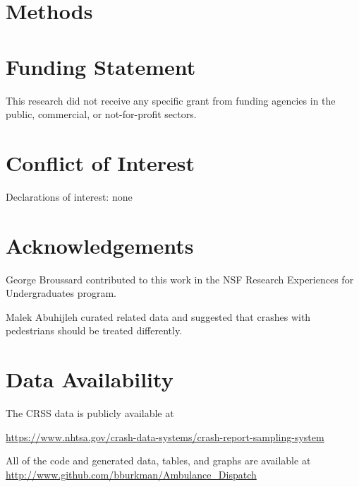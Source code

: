 \documentclass[fleqn]{cas-sc}
\begin{document}
\section{Methods}\label{sec:Methods}

%

\FloatBarrier















\section*{Funding Statement}

This research did not receive any specific grant from funding agencies in the public, commercial, or not-for-profit sectors.

\section*{Conflict of Interest}

Declarations of interest: none

\section*{Acknowledgements}

George Broussard contributed to this work in the NSF Research Experiences for Undergraduates program.

Malek Abuhijleh curated related data and suggested that crashes with pedestrians should be treated differently.  

\section*{Data Availability}

The CRSS data is publicly available at 

\url{https://www.nhtsa.gov/crash-data-systems/crash-report-sampling-system}

All of the code and generated data, tables, and graphs are available at 
\url{http://www.github.com/bburkman/Ambulance_Dispatch}
\end{document}
